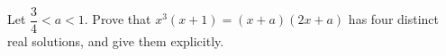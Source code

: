 Let $\dfrac{3}{4}<a<1$. Prove that $x^3(x+1)=(x+a)(2x+a)$ has four distinct real solutions, and give them explicitly.
